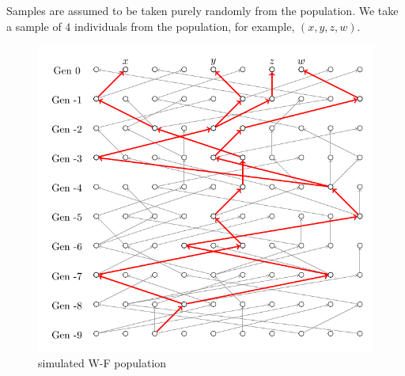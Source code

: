 \documentclass[12pt]{book}
\begin{document}
        Samples are assumed to be taken purely randomly from the population. We take a sample of $4$ individuals from the population, for example, $(x,y,z,w)$.  
        \begin{figure}[htbp]
            \centering
            \includegraphics[scale = 1]{fig/W-F_123_label.pdf}
            \caption{simulated W-F population}
        \end{figure}
\end{document}
